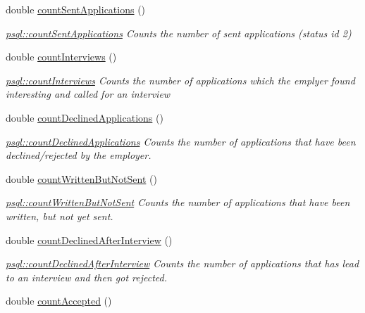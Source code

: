 \begin{DoxyCompactItemize}
double \mbox{\hyperlink{classpsql_af5e6768f6c51ac7b94571505f7a628e4}{count\+Sent\+Applications}} ()
\begin{DoxyCompactList}\small\item\em \mbox{\hyperlink{classpsql_af5e6768f6c51ac7b94571505f7a628e4}{psql\+::count\+Sent\+Applications}} Counts the number of sent applications (status id 2) \end{DoxyCompactList}\item 
double \mbox{\hyperlink{classpsql_a84c1fdea2d09783a39677c4f79d924fc}{count\+Interviews}} ()
\begin{DoxyCompactList}\small\item\em \mbox{\hyperlink{classpsql_a84c1fdea2d09783a39677c4f79d924fc}{psql\+::count\+Interviews}} Counts the number of applications which the emplyer found interesting and called for an interview \end{DoxyCompactList}\item 
double \mbox{\hyperlink{classpsql_a40541367c3af9c0ac94e2fb92f00f53c}{count\+Declined\+Applications}} ()
\begin{DoxyCompactList}\small\item\em \mbox{\hyperlink{classpsql_a40541367c3af9c0ac94e2fb92f00f53c}{psql\+::count\+Declined\+Applications}} Counts the number of applications that have been declined/rejected by the employer. \end{DoxyCompactList}\item 
double \mbox{\hyperlink{classpsql_a70ad9f4b00735a55232f46da4edd2edc}{count\+Written\+But\+Not\+Sent}} ()
\begin{DoxyCompactList}\small\item\em \mbox{\hyperlink{classpsql_a70ad9f4b00735a55232f46da4edd2edc}{psql\+::count\+Written\+But\+Not\+Sent}} Counts the number of applications that have been written, but not yet sent. \end{DoxyCompactList}\item 
double \mbox{\hyperlink{classpsql_a2ae512bc231446d5fccae84582395675}{count\+Declined\+After\+Interview}} ()
\begin{DoxyCompactList}\small\item\em \mbox{\hyperlink{classpsql_a2ae512bc231446d5fccae84582395675}{psql\+::count\+Declined\+After\+Interview}} Counts the number of applications that has lead to an interview and then got rejected. \end{DoxyCompactList}\item 
double \mbox{\hyperlink{classpsql_a0beec2f098edc0961f27774cdd54d09b}{count\+Accepted}} ()

\end{DoxyCompactItemize}
